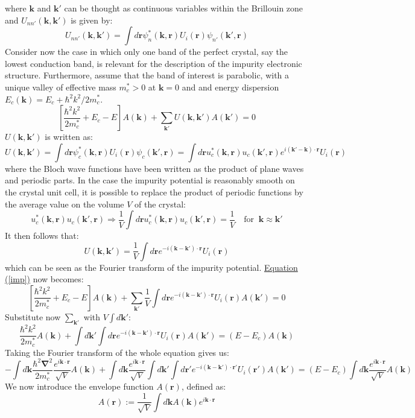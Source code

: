 \documentclass[10.75pt,a4paper,openright,bottom=2cm]{article}
\renewcommand{\Vec}[1]{\boldsymbol{#1}}
\renewcommand{\refeq}[1]{\hyperref[#1]{Equation (\ref{#1})}}
\begin{document}
where $\Vec{k}$ and $\Vec{k'}$ can be thought as continuous variables within the Brillouin zone and $U_{nn'}(\Vec{k},\Vec{k'})$ is given by:
\[
U_{nn'}(\Vec{k},\Vec{k'})=\int d\Vec{r}\psi_n^*(\Vec{k},\Vec{r})U_i(\Vec{r})\psi_{n'}(\Vec{k'},\Vec{r})
\]
Consider now the case in which only one band of the perfect crystal, say the lowest conduction band, is relevant for the description of the impurity electronic structure. Furthermore, assume that the band of interest is parabolic, with a unique valley of effective mass $m_c^*>0$ at $\Vec{k}=0$ and and energy dispersion $E_c(\Vec{k})=E_c+\hbar^2k^2/2m_c^*$.
\begin{equation}
\label{imp}
\left[\frac{\hbar^2k^2}{2m_c^*}+E_c-E\right]A(\Vec{k})+\sum_{\Vec{k'}}U(\Vec{k},\Vec{k'})A(\Vec{k'})=0
\end{equation}
$U(\Vec{k},\Vec{k'})$ is written as:
\[
U(\Vec{k},\Vec{k'})=\int d\Vec{r}\psi_c^*(\Vec{k},\Vec{r})U_i(\Vec{r})\psi_c(\Vec{k'},\Vec{r})=\int d\Vec{r}u_c^*(\Vec{k},\Vec{r})u_c(\Vec{k'},\Vec{r})e^{i(\Vec{k'}-\Vec{k})\cdot\Vec{r}}U_i(\Vec{r})
\]
where the Bloch wave functions have been written as the product of plane waves and periodic parts. In the case the impurity potential is reasonably smooth on the crystal unit cell, it is possible to replace the product of periodic functions by the average value on the volume $V$ of the
crystal:
\[
u_c^*(\Vec{k},\Vec{r})u_c(\Vec{k'},\Vec{r})\Rightarrow\frac{1}{V}\int d\Vec{r}u_c^*(\Vec{k},\Vec{r})u_c(\Vec{k'},\Vec{r})=\frac{1}{V} \quad\text{for}\;\;\Vec{k}\approx\Vec{k'}
\]
It then follows that:
\[
U(\Vec{k},\Vec{k'})=\frac{1}{V}\int d\Vec{r}e^{-i(\Vec{k}-\Vec{k'})\cdot\Vec{r}}U_i(\Vec{r})
\]
which can be seen as the Fourier transform of the impurity potential. \refeq{imp} now becomes:
\[
\left[\frac{\hbar^2k^2}{2m_c^*}+E_c-E\right]A(\Vec{k})+\sum_{\Vec{k'}}\frac{1}{V}\int d\Vec{r}e^{-i(\Vec{k}-\Vec{k'})\cdot\Vec{r}}U_i(\Vec{r})A(\Vec{k'})=0
\]
Substitute now $\sum_{\Vec{k'}}$ with $V\int d\Vec{k'}$:
\[
\frac{\hbar^2k^2}{2m_c^*}A(\Vec{k})+\int d\Vec{k'}\int d\Vec{r}e^{-i(\Vec{k}-\Vec{k'})\cdot\Vec{r}}U_i(\Vec{r})A(\Vec{k'})=(E-E_c)A(\Vec{k})
\]
Taking the Fourier transform of the whole equation gives us:
\[
-\int d\Vec{k}\frac{\hbar^2\Vec{\nabla}^2}{2m_c^*}\frac{e^{i\Vec{k}\cdot\Vec{r}}}{\sqrt{V}}A(\Vec{k})+\int d\Vec{k}\frac{e^{i\Vec{k}\cdot\Vec{r}}}{\sqrt{V}}\int d\Vec{k'}\int d\Vec{r'}e^{-i(\Vec{k}-\Vec{k'})\cdot\Vec{r'}}U_i(\Vec{r'})A(\Vec{k'})=(E-E_c)\int d\Vec{k}\frac{e^{i\Vec{k}\cdot\Vec{r}}}{\sqrt{V}}A(\Vec{k})
\]
We now introduce the envelope function $A(\Vec{r})$, defined as:
\[
A(\Vec{r}):=\frac{1}{\sqrt{V}}\int d\Vec{k}A(\Vec{k})e^{i\Vec{k}\cdot\Vec{r}}
\]
\end{document}
